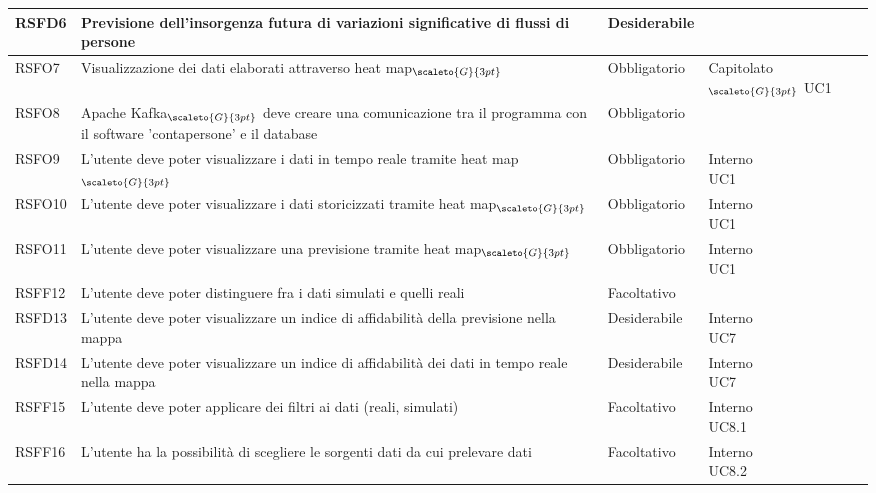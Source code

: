 {\begin{center}
\begin{longtable}{|p{3cm}|p{4cm}|p{4cm}|p{4cm}|}
			\hline
			\centering RSFD6 & Previsione dell'insorgenza futura di variazioni significative di flussi di persone & \centering Desiderabile & \makecell[tc]{Capitolato$_{\scaleto{G}{3pt}}$ }  \\
			\hline
			\centering RSFO7 & Visualizzazione dei dati elaborati attraverso heat map$_{\scaleto{G}{3pt}}$ &\centering  Obbligatorio & \makecell[tc]{Capitolato$_{\scaleto{G}{3pt}}$ \\ UC1}  \\
			\hline
			\centering RSFO8 & Apache Kafka$_{\scaleto{G}{3pt}}$ deve creare una comunicazione tra il programma con il software 'contapersone' e il database  &\centering  Obbligatorio &  \makecell[tc]{Interno} 	\\
			\hline
			\centering RSFO9 & L'utente deve poter visualizzare i dati in tempo reale tramite heat map$_{\scaleto{G}{3pt}}$  &\centering  Obbligatorio &  \makecell[tc]{Interno \\ UC1} 	\\
			\hline
			\centering RSFO10 & L'utente deve poter visualizzare i dati storicizzati tramite heat map$_{\scaleto{G}{3pt}}$  &\centering  Obbligatorio &  \makecell[tc]{Interno \\ UC1} 	\\
			\hline
			\centering RSFO11 & L'utente deve poter visualizzare una previsione tramite heat map$_{\scaleto{G}{3pt}}$  &\centering  Obbligatorio &  \makecell[tc]{Interno \\ UC1} 	\\
			\hline
			\centering RSFF12 & L'utente deve poter distinguere fra i dati simulati e quelli reali  &\centering  Facoltativo &  \makecell[tc]{Interno} 	\\
			\hline
			\centering RSFD13 & L'utente deve poter visualizzare un indice di affidabilità della previsione nella mappa  &\centering  Desiderabile &  \makecell[tc]{Interno \\ UC7} 	\\
			\hline
			\centering RSFD14 & L'utente deve poter visualizzare un indice di affidabilità dei dati in tempo reale nella mappa  &\centering  Desiderabile &  \makecell[tc]{Interno \\ UC7} 	\\
			\hline
			\centering RSFF15 & L'utente deve poter applicare dei filtri ai dati (reali, simulati)  &\centering  Facoltativo &  \makecell[tc]{Interno \\ UC8.1 } 	\\
			\hline
			\centering RSFF16 & L'utente ha la possibilità di scegliere le sorgenti dati da cui prelevare dati  &\centering  Facoltativo &  \makecell[tc]{Interno \\ UC8.2} 	\\

\end{longtable}
\end{center}}
